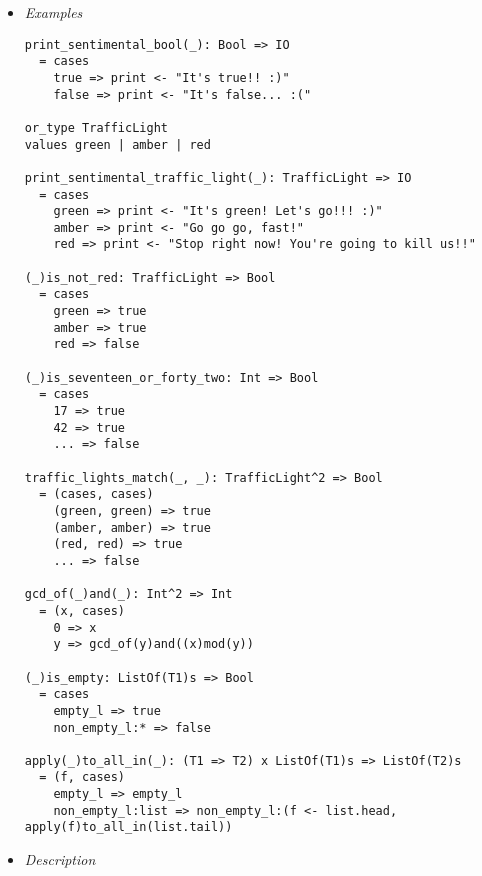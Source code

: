 \documentclass{article}
\begin{document}
\begin{itemize}
\item \textit{Examples}

\begin{verbatim}
print_sentimental_bool(_): Bool => IO
  = cases
    true => print <- "It's true!! :)"
    false => print <- "It's false... :("

or_type TrafficLight
values green | amber | red

print_sentimental_traffic_light(_): TrafficLight => IO
  = cases
    green => print <- "It's green! Let's go!!! :)"
    amber => print <- "Go go go, fast!"
    red => print <- "Stop right now! You're going to kill us!!"

(_)is_not_red: TrafficLight => Bool
  = cases
    green => true
    amber => true
    red => false

(_)is_seventeen_or_forty_two: Int => Bool
  = cases
    17 => true
    42 => true
    ... => false

traffic_lights_match(_, _): TrafficLight^2 => Bool
  = (cases, cases)
    (green, green) => true
    (amber, amber) => true
    (red, red) => true
    ... => false

gcd_of(_)and(_): Int^2 => Int
  = (x, cases)
    0 => x
    y => gcd_of(y)and((x)mod(y))

(_)is_empty: ListOf(T1)s => Bool
  = cases
    empty_l => true
    non_empty_l:* => false

apply(_)to_all_in(_): (T1 => T2) x ListOf(T1)s => ListOf(T2)s
  = (f, cases)
    empty_l => empty_l
    non_empty_l:list => non_empty_l:(f <- list.head, apply(f)to_all_in(list.tail))

\end{verbatim}

\newpage

\item \textit{Description}


\end{itemize}
\end{document}
